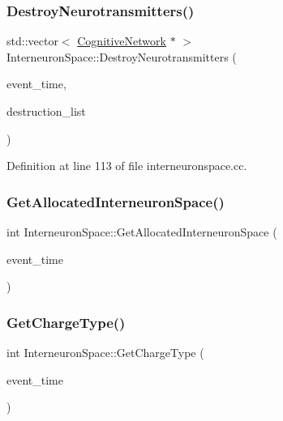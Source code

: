 \subsubsection{\texorpdfstring{Destroy\+Neurotransmitters()}{DestroyNeurotransmitters()}}
{\footnotesize\ttfamily std\+::vector$<$ \mbox{\hyperlink{class_cognitive_network}{Cognitive\+Network}} $\ast$ $>$ Interneuron\+Space\+::\+Destroy\+Neurotransmitters (\begin{DoxyParamCaption}\item[{std\+::chrono\+::time\+\_\+point$<$ \mbox{\hyperlink{universe_8h_a0ef8d951d1ca5ab3cfaf7ab4c7a6fd80}{Clock}} $>$}]{event\+\_\+time,  }\item[{std\+::vector$<$ \mbox{\hyperlink{class_cognitive_network}{Cognitive\+Network}} $\ast$$>$}]{destruction\+\_\+list }\end{DoxyParamCaption})}



Definition at line 113 of file interneuronspace.\+cc.

\mbox{\label{class_interneuron_space_a4b053dc94a921c8176d9f58d40169089}} 
\subsubsection{\texorpdfstring{Get\+Allocated\+Interneuron\+Space()}{GetAllocatedInterneuronSpace()}}
{\footnotesize\ttfamily int Interneuron\+Space\+::\+Get\+Allocated\+Interneuron\+Space (\begin{DoxyParamCaption}\item[{std\+::chrono\+::time\+\_\+point$<$ \mbox{\hyperlink{universe_8h_a0ef8d951d1ca5ab3cfaf7ab4c7a6fd80}{Clock}} $>$}]{event\+\_\+time }\end{DoxyParamCaption})}

\mbox{\label{class_interneuron_space_a90a2c950dd426ed3f015e3c186e877fd}} 
\subsubsection{\texorpdfstring{Get\+Charge\+Type()}{GetChargeType()}}
{\footnotesize\ttfamily int Interneuron\+Space\+::\+Get\+Charge\+Type (\begin{DoxyParamCaption}\item[{std\+::chrono\+::time\+\_\+point$<$ \mbox{\hyperlink{universe_8h_a0ef8d951d1ca5ab3cfaf7ab4c7a6fd80}{Clock}} $>$}]{event\+\_\+time }\end{DoxyParamCaption})\hspace{0.3cm}{\ttfamily [inline]}}



